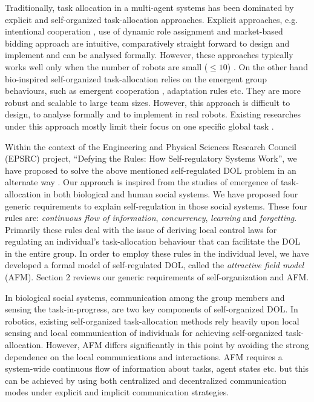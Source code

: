 \documentclass{intech}
\begin{document}
Traditionally, task allocation in a multi-agent systems has been dominated by explicit and self-organized task-allocation approaches. Explicit approaches, e.g. intentional cooperation \citep{Parker2008}, use of dynamic role assignment \citep{Chaimowicz2002} and market-based bidding approach \citep{Dias+2006} are intuitive, comparatively straight forward to design and implement and can be analysed formally. However, these approaches typically works well only when the number of robots are small ($\leq 10$) \citep{Lerman+2006}. On the other hand bio-inspired self-organized task-allocation relies on the emergent group behaviours, such as emergent cooperation \citep{Kube+1993}, adaptation rules \citep{Liu+2007} etc. They are more robust and scalable to large team sizes. However, this  approach is difficult to design, to analyse formally and to implement in real robots. Existing researches under this approach mostly limit their focus on one specific global task \citep{Gerkey+2004}.

Within the context of the Engineering and Physical Sciences Research Council (EPSRC) project, ``Defying the Rules: How Self-regulatory Systems Work'', we have proposed to solve the above mentioned self-regulated DOL problem in an alternate way \citep{Arcaute+2008}. Our approach is inspired from the studies of emergence of task-allocation in both biological and human social systems. We have proposed four generic requirements to explain self-regulation in those social systems. These four rules are: \textit{continuous flow of information}, \textit{concurrency}, \textit{learning} and \textit{forgetting}. Primarily these rules deal with the issue of deriving local control laws for regulating an individual's task-allocation behaviour that can facilitate the DOL in the entire group. In order to employ these rules in the individual level, we have developed a formal model of self-regulated DOL, called the \textit{attractive field model} (AFM). Section 2 reviews our generic requirements of self-organization and AFM.

In biological social systems, communication among the group members and  sensing the task-in-progress, are two key components of self-organized DOL. In robotics, existing self-organized task-allocation methods rely heavily upon local sensing and local communication of individuals for achieving self-organized task-allocation. However, AFM differs significantly in this point by avoiding the strong dependence on the local communications and interactions. AFM requires a system-wide continuous flow of information about tasks, agent states etc. but this can be achieved by using both centralized and decentralized communication modes under explicit and implicit communication strategies. 
\end{document}

